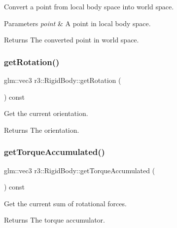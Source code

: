 Convert a point from local body space into world space. 


\begin{DoxyParams}{Parameters}
{\em point} & A point in local body space. \\
\hline
\end{DoxyParams}
\begin{DoxyReturn}{Returns}
The converted point in world space. 
\end{DoxyReturn}
\mbox{\label{classr3_1_1_rigid_body_afd8accdd3c9a75053eaeac0c9c35d07d}} 
\subsubsection{\texorpdfstring{get\+Rotation()}{getRotation()}}
{\footnotesize\ttfamily glm\+::vec3 r3\+::\+Rigid\+Body\+::get\+Rotation (\begin{DoxyParamCaption}{ }\end{DoxyParamCaption}) const}



Get the current orientation. 

\begin{DoxyReturn}{Returns}
The orientation. 
\end{DoxyReturn}
\mbox{\label{classr3_1_1_rigid_body_a8a5111fa2e4bd5f3a2615525da4c2949}} 
\subsubsection{\texorpdfstring{get\+Torque\+Accumulated()}{getTorqueAccumulated()}}
{\footnotesize\ttfamily glm\+::vec3 r3\+::\+Rigid\+Body\+::get\+Torque\+Accumulated (\begin{DoxyParamCaption}{ }\end{DoxyParamCaption}) const}



Get the current sum of rotational forces. 

\begin{DoxyReturn}{Returns}
The torque accumulator. 
\end{DoxyReturn}
\mbox{\label{classr3_1_1_rigid_body_a5a96949cb2103e3c4d563849a6c8fb94}} 
